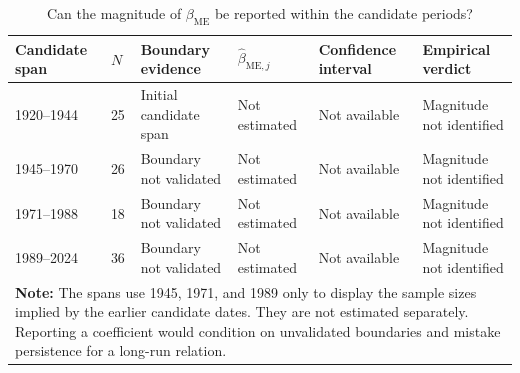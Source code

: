 \begin{table}[h!]
\centering\small
\caption{Can the magnitude of $\beta_{\mathrm{ME}}$ be reported within the candidate periods?}
\label{tab:period-beta}
\begin{tabular}{p{2.05cm}p{0.75cm}p{2.55cm}p{2.0cm}p{2.0cm}p{3.25cm}}
\toprule
\textbf{Candidate span} & \textbf{$N$} & \textbf{Boundary evidence} & \textbf{$\hat\beta_{\mathrm{ME},j}$} & \textbf{Confidence interval} & \textbf{Empirical verdict}\\
\midrule
1920--1944 & 25 & Initial candidate span & Not estimated & Not available & Magnitude not identified \\
1945--1970 & 26 & Boundary not validated & Not estimated & Not available & Magnitude not identified \\
1971--1988 & 18 & Boundary not validated & Not estimated & Not available & Magnitude not identified \\
1989--2024 & 36 & Boundary not validated & Not estimated & Not available & Magnitude not identified \\
\bottomrule
\multicolumn{6}{p{13.1cm}}{\footnotesize \textbf{Note:} The spans use 1945, 1971, and 1989 only to display the sample sizes implied by the earlier candidate dates. They are not estimated separately. Reporting a coefficient would condition on unvalidated boundaries and mistake persistence for a long-run relation.}
\end{tabular}
\end{table}
